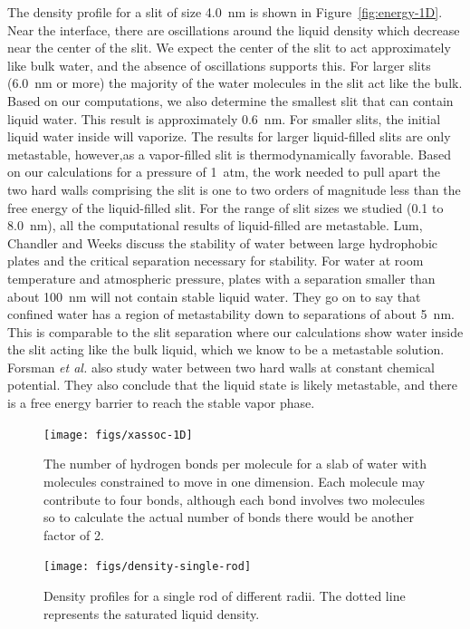\documentclass[letterpaper,twocolumn,amsmath,amssymb,prb]{revtex4-1}
\begin{document}
The density profile for a slit of size 4.0~nm is shown in Figure~\ref{fig:energy-1D}. 
Near the interface, there are oscillations around the
liquid density which decrease near the center of the slit. We expect the center
of the slit to act approximately like bulk water, and the absence of
oscillations supports this. For larger slits (6.0~nm or more) the majority of
the water molecules in the slit act like the bulk. Based on our computations, we
also determine the smallest slit that can contain liquid water. This result is
approximately 0.6~nm. For smaller slits, the initial liquid water inside will
vaporize. The results for larger liquid-filled slits are only metastable,
however,as a vapor-filled slit is thermodynamically favorable. Based on our
calculations for a pressure of 1~atm, the work needed to pull apart
the two hard walls comprising the slit is one to two orders of magnitude less
than the free energy of the liquid-filled slit. For the range of slit sizes we
studied (0.1 to 8.0~nm), all the computational results of liquid-filled are
metastable. Lum, Chandler and Weeks \cite{lum1999hydrophobicity} discuss the
stability of water between large hydrophobic plates and the critical separation
necessary for stability. For water at room temperature and atmospheric pressure,
plates with a separation smaller than about 100~nm will not contain stable liquid
water. They go on to say that confined water has a region of metastability down
to separations of about 5~nm. This is comparable to the slit separation where
our calculations show water inside the slit acting like the bulk liquid, which
we know to be a metastable solution. Forsman \emph{et al.}\cite{forsman1996computer}
also study water between two hard walls at constant chemical potential. They 
also conclude that the liquid state is likely metastable, and there is a free
energy barrier to reach the stable vapor phase. 

\begin{figure}
\begin{center}
\texttt{[image: figs/xassoc-1D]}
\end{center}
\caption{The number of hydrogen bonds per molecule for a slab of water 
with molecules constrained to move in one dimension. Each molecule may
contribute to
four bonds, although each bond involves two molecules so to calculate the
actual 
number of bonds there would be another factor of 2.}
\label{fig:xassoc-1D}
\end{figure}

\begin{figure}
\begin{center}
\texttt{[image: figs/density-single-rod]}
\end{center}
\caption{ Density profiles for a single rod of different radii. The dotted line
represents the saturated liquid density.  }
\label{fig:density-single-rod}
\end{figure}
\end{document}
